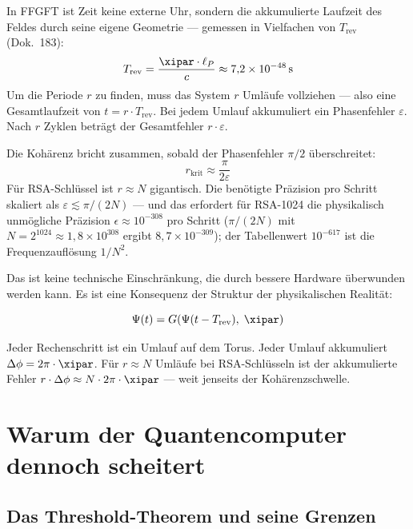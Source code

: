 In FFGFT ist Zeit keine externe Uhr, sondern die akkumulierte Laufzeit des Feldes
durch seine eigene Geometrie — gemessen in Vielfachen von $T_\text{rev}$ (Dok.~183):
\begin{equation}
    T_\text{rev} = \frac{\xipar \cdot \ell_P}{c} \approx 7{,}2 \times 10^{-48}\,\text{s}
\end{equation}
Um die Periode $r$ zu finden, muss das System $r$ Umläufe vollziehen — also eine
Gesamtlaufzeit von $t = r \cdot T_\text{rev}$. Bei jedem Umlauf akkumuliert ein
Phasenfehler $\varepsilon$. Nach $r$ Zyklen beträgt der Gesamtfehler $r \cdot \varepsilon$.

Die Kohärenz bricht zusammen, sobald der Phasenfehler $\pi/2$ überschreitet:
\begin{equation}
    r_\text{krit} \approx \frac{\pi}{2\varepsilon}
\end{equation}
Für RSA-Schlüssel ist $r \approx N$ gigantisch. Die benötigte Präzision pro Schritt
skaliert als $\varepsilon \lesssim \pi/(2N)$ — und das erfordert für RSA-1024
die physikalisch unmögliche Präzision $\epsilon \approx 10^{-308}$ pro Schritt
($\pi/(2N)$ mit $N = 2^{1024} \approx 1{,}8\times 10^{308}$ ergibt $8{,}7\times 10^{-309}$);
der Tabellenwert $10^{-617}$ ist die Frequenzauflösung $1/N^2$.

\begin{foundation}
Das ist keine technische Einschränkung, die durch bessere Hardware überwunden
werden kann. Es ist eine Konsequenz der Struktur der physikalischen Realität:

\begin{equation}
    \Psi(t) = G\!\left(\Psi(t - T_\text{rev}),\; \xipar\right)
\end{equation}

Jeder Rechenschritt ist ein Umlauf auf dem Torus. Jeder Umlauf akkumuliert
$\Delta\phi = 2\pi \cdot \xipar$. Für $r \approx N$ Umläufe bei RSA-Schlüsseln
ist der akkumulierte Fehler $r \cdot \Delta\phi \approx N \cdot 2\pi \cdot \xipar$
— weit jenseits der Kohärenzschwelle.
\end{foundation}


\section{Warum der Quantencomputer dennoch scheitert}

\subsection{Das Threshold-Theorem und seine Grenzen}

